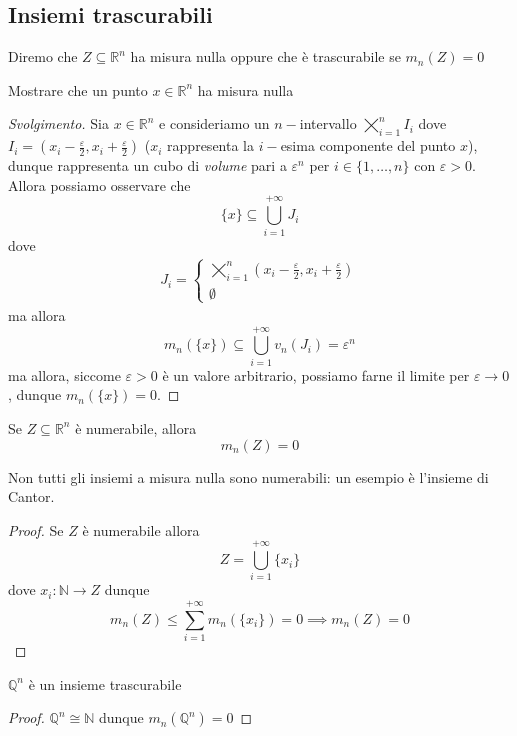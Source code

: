 \subsection{Insiemi trascurabili}
\begin{definition}
	Diremo che $Z \subseteq \mathbb{R}^n$ ha misura nulla oppure che è trascurabile se $m_n(Z) = 0$
\end{definition}
\begin{exercise}
	Mostrare che un punto $x \in \mathbb{R}^n$ ha misura nulla
\end{exercise}
\begin{proof}[Svolgimento]
	Sia $x \in \mathbb{R}^n$ e consideriamo un $n-$intervallo $\varprod\limits_{i=1}^n I_i$ dove $I_i = (x_i - \frac{\varepsilon}{2}, x_i + \frac{\varepsilon}{2})$ ($x_i$ rappresenta la $i-$esima componente del punto $x$), dunque rappresenta un cubo di \emph{volume} pari a $\varepsilon^n$ per $i \in \{1, \ldots, n \}$ con $\varepsilon > 0$. Allora possiamo osservare che
	$$
	\{ x \} \subseteq \bigcup_{i=1}^{+\infty} J_i
	$$
	dove
	\begin{align*}
		J_i = \begin{cases}
			\varprod\limits_{i=1}^n (x_i - \frac{\varepsilon}{2}, x_i + \frac{\varepsilon}{2}) \\
			\emptyset
		\end{cases}
	\end{align*}
	ma allora
	$$
	m_n(\{ x \}) \subseteq \bigcup_{i=1}^{+\infty} v_n(J_i) = \varepsilon^n
	$$
	ma allora, siccome $\varepsilon > 0$ è un valore arbitrario, possiamo farne il limite per $\varepsilon \to 0$, dunque $m_n(\{ x \}) = 0$.
\end{proof}
\begin{prop}
	Se $Z \subseteq \mathbb{R}^n$ è numerabile, allora
	$$
		m_n(Z) = 0
	$$
\end{prop}
\begin{remark}
	Non tutti gli insiemi a misura nulla sono numerabili: un esempio è l'insieme di Cantor.
\end{remark}
\begin{proof}
	Se $Z$ è numerabile allora
	$$
		Z = \bigcup_{i=1}^{+\infty} \{ x_i \}
	$$
	dove $x_i: \mathbb{N} \to Z$ dunque
	$$
	m_n(Z) \leq \sum_{i=1}^{+\infty} m_n(\{ x_i \}) = 0 \implies m_n(Z) = 0
	$$
\end{proof}
\begin{cor}
	$\mathbb{Q}^n$ è un insieme trascurabile
\end{cor}
\begin{proof}
$\mathbb{Q}^n \cong \mathbb{N}$ dunque $m_n(\mathbb{Q}^n) = 0$
\end{proof}
